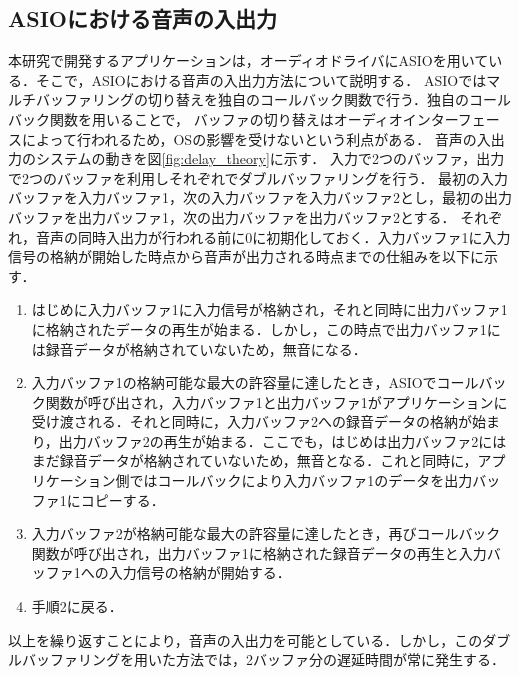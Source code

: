 \subsection{ASIOにおける音声の入出力}
本研究で開発するアプリケーションは，オーディオドライバにASIOを用いている．そこで，ASIOにおける音声の入出力方法について説明する．
ASIOではマルチバッファリングの切り替えを独自のコールバック関数で行う．独自のコールバック関数を用いることで，
バッファの切り替えはオーディオインターフェースによって行われるため，OSの影響を受けないという利点がある．
音声の入出力のシステムの動きを図\ref{fig:delay_theory}に示す．
入力で2つのバッファ，出力で2つのバッファを利用しそれぞれでダブルバッファリングを行う．
最初の入力バッファを入力バッファ1，次の入力バッファを入力バッファ2とし，最初の出力バッファを出力バッファ1，次の出力バッファを出力バッファ2とする．
それぞれ，音声の同時入出力が行われる前に0に初期化しておく．入力バッファ1に入力信号の格納が開始した時点から音声が出力される時点までの仕組みを以下に示す．
\begin{enumerate}[leftmargin=*]
\item はじめに入力バッファ1に入力信号が格納され，それと同時に出力バッファ1に格納されたデータの再生が始まる．しかし，この時点で出力バッファ1には録音データが格納されていないため，無音になる．
\item 入力バッファ1の格納可能な最大の許容量に達したとき，ASIOでコールバック関数が呼び出され，入力バッファ1と出力バッファ1がアプリケーションに受け渡される．それと同時に，入力バッファ2への録音データの格納が始まり，出力バッファ2の再生が始まる．ここでも，はじめは出力バッファ2にはまだ録音データが格納されていないため，無音となる．これと同時に，アプリケーション側ではコールバックにより入力バッファ1のデータを出力バッファ1にコピーする．
\item 入力バッファ2が格納可能な最大の許容量に達したとき，再びコールバック関数が呼び出され，出力バッファ1に格納された録音データの再生と入力バッファ1への入力信号の格納が開始する．
\item 手順2に戻る．
\end{enumerate}
以上を繰り返すことにより，音声の入出力を可能としている．しかし，このダブルバッファリングを用いた方法では，2バッファ分の遅延時間が常に発生する．
